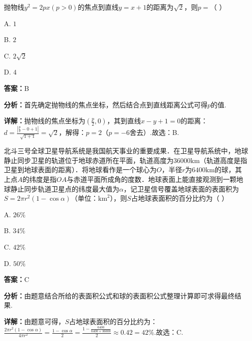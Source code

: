 \begin{question}[points=5]
抛物线$y^2=2px(p>0)$的焦点到直线$y=x+1$的距离为$\sqrt{2}$，则$p=$（ ）
\begin{choices}
  \item A. $1$
  \item B. $2$
  \item C. $2\sqrt{2}$
  \item D. $4$
\end{choices}
\begin{solution}
\textbf{答案：}B

\textbf{分析：}首先确定抛物线的焦点坐标，然后结合点到直线距离公式可得$p$的值.

\textbf{详解：}抛物线的焦点坐标为$(\frac{p}{2},0)$，其到直线$x-y+1=0$的距离：$d=\frac{|\frac{p}{2}-0+1|}{\sqrt{1+1}}=\sqrt{2}$，解得：$p=2$（$p=-6$舍去）.故选：B.
\end{solution}
\end{question}

\begin{question}[points=5]
北斗三号全球卫星导航系统是我国航天事业的重要成果．在卫星导航系统中，地球静止同步卫星的轨道位于地球赤道所在平面，轨道高度为$36000\text{km}$（轨道高度是指卫星到地球表面的距离）．将地球看作是一个球心为$O$，半径$r$为$6400\text{km}$的球，其上点$A$的纬度是指$OA$与赤道平面所成角的度数．地球表面上能直接观测到一颗地球静止同步轨道卫星点的纬度最大值为$\alpha$，记卫星信号覆盖地球表面的表面积为$S=2\pi r^2(1-\cos\alpha)$（单位：$\text{km}^2$），则$S$占地球表面积的百分比约为（ ）
\begin{choices}
  \item A. $26\%$
  \item B. $34\%$
  \item C. $42\%$
  \item D. $50\%$
\end{choices}
\begin{solution}
\textbf{答案：}C

\textbf{分析：}由题意结合所给的表面积公式和球的表面积公式整理计算即可求得最终结果.

\textbf{详解：}由题意可得，$S$占地球表面积的百分比约为：$\frac{2\pi r^2(1-\cos\alpha)}{4\pi r^2}=\frac{1-\cos\alpha}{2}=\frac{1-\frac{6400}{6400+36000}}{2}\approx0.42=42\%$.故选：C.
\end{solution}
\end{question}


